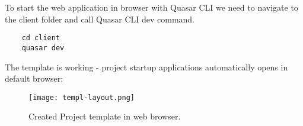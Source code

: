 To start the web application in browser with Quasar CLI we need to navigate to the client folder and call Quasar CLI dev command.

\begin{verbatim}
    cd client
    quasar dev
\end{verbatim}

The template is working - project startup applications automatically opens in default browser:

\begin{figure} [H]
    \centering
    \texttt{[image: templ-layout.png]}
    \caption[Layout]{\label{fig:grail}Created Project template in web browser.}
\end{figure}


\section{}%
\label{sec:functionalities}


\section{}%
\label{sec:desktop}

\section{}%
\label{sec:mobile}


\chapter{}%
\label{ch:synchronisation}
